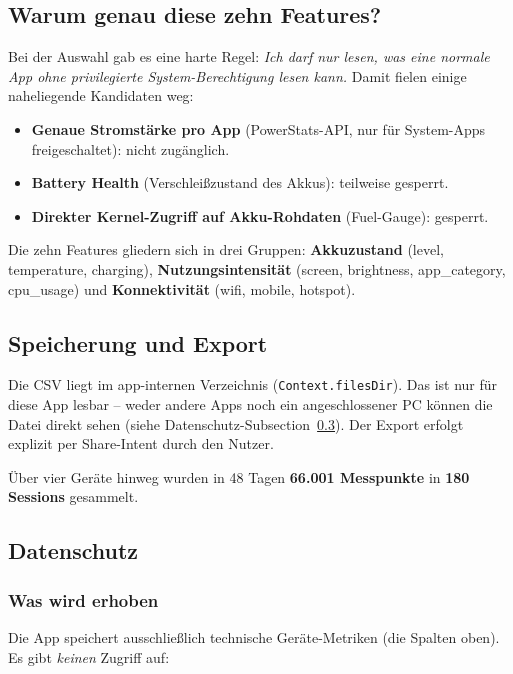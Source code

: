 \documentclass[12pt, a4paper, ngerman]{article}
\newcommand{\code}[1]{\texttt{#1}}
\begin{document}
\subsection{Warum genau diese zehn Features?}

Bei der Auswahl gab es eine harte Regel: \emph{Ich darf nur lesen,
was eine normale App ohne privilegierte System-Berechtigung lesen
kann.} Damit
fielen einige naheliegende Kandidaten weg:

\begin{itemize}
\item \textbf{Genaue Stromstärke pro App} (PowerStats-API, nur
  für System-Apps freigeschaltet): nicht zugänglich.
\item \textbf{Battery Health} (Verschleißzustand des Akkus):
  teilweise gesperrt.
\item \textbf{Direkter Kernel-Zugriff auf Akku-Rohdaten}
  (Fuel-Gauge): gesperrt.
\end{itemize}

Die zehn Features gliedern sich in drei Gruppen:
\textbf{Akkuzustand} (level, temperature, charging),
\textbf{Nutzungsintensität} (screen, brightness, app\_category,
cpu\_usage) und \textbf{Konnektivität} (wifi, mobile, hotspot).

\subsection{Speicherung und Export}

Die CSV liegt im app-internen Verzeichnis
(\code{Context.filesDir}). Das ist nur für diese App lesbar -- weder
andere Apps noch ein angeschlossener PC können die Datei direkt
sehen (siehe Datenschutz-Subsection~\ref{sec:datenschutz}). Der
Export erfolgt explizit per Share-Intent durch den Nutzer.

Über vier Geräte hinweg wurden in 48 Tagen
\textbf{66.001 Messpunkte} in \textbf{180 Sessions} gesammelt.

\subsection{Datenschutz}
\label{sec:datenschutz}

\subsubsection*{Was wird erhoben}

Die App speichert ausschließlich technische Geräte-Metriken (die
Spalten oben). Es gibt \emph{keinen} Zugriff auf:
\end{document}
